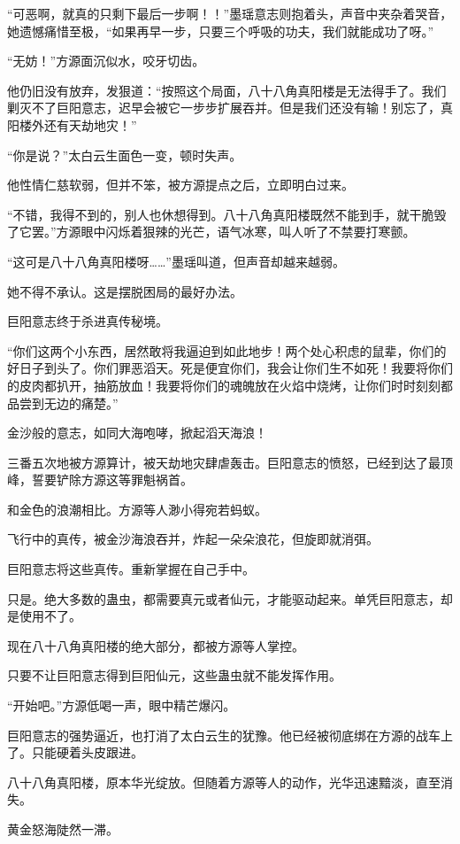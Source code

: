 \begin{this_body}
“可恶啊，就真的只剩下最后一步啊！！”墨瑶意志则抱着头，声音中夹杂着哭音，她遗憾痛惜至极，“如果再早一步，只要三个呼吸的功夫，我们就能成功了呀。”

“无妨！”方源面沉似水，咬牙切齿。

他仍旧没有放弃，发狠道：“按照这个局面，八十八角真阳楼是无法得手了。我们剿灭不了巨阳意志，迟早会被它一步步扩展吞并。但是我们还没有输！别忘了，真阳楼外还有天劫地灾！”

“你是说？”太白云生面色一变，顿时失声。

他性情仁慈软弱，但并不笨，被方源提点之后，立即明白过来。

“不错，我得不到的，别人也休想得到。八十八角真阳楼既然不能到手，就干脆毁了它罢。”方源眼中闪烁着狠辣的光芒，语气冰寒，叫人听了不禁要打寒颤。

“这可是八十八角真阳楼呀……”墨瑶叫道，但声音却越来越弱。

她不得不承认。这是摆脱困局的最好办法。

巨阳意志终于杀进真传秘境。

“你们这两个小东西，居然敢将我逼迫到如此地步！两个处心积虑的鼠辈，你们的好日子到头了。你们罪恶滔天。死是便宜你们，我会让你们生不如死！我要将你们的皮肉都扒开，抽筋放血！我要将你们的魂魄放在火焰中烧烤，让你们时时刻刻都品尝到无边的痛楚。”

金沙般的意志，如同大海咆哮，掀起滔天海浪！

三番五次地被方源算计，被天劫地灾肆虐轰击。巨阳意志的愤怒，已经到达了最顶峰，誓要铲除方源这等罪魁祸首。

和金色的浪潮相比。方源等人渺小得宛若蚂蚁。

飞行中的真传，被金沙海浪吞并，炸起一朵朵浪花，但旋即就消弭。

巨阳意志将这些真传。重新掌握在自己手中。

只是。绝大多数的蛊虫，都需要真元或者仙元，才能驱动起来。单凭巨阳意志，却是使用不了。

现在八十八角真阳楼的绝大部分，都被方源等人掌控。

只要不让巨阳意志得到巨阳仙元，这些蛊虫就不能发挥作用。

“开始吧。”方源低喝一声，眼中精芒爆闪。

巨阳意志的强势逼近，也打消了太白云生的犹豫。他已经被彻底绑在方源的战车上了。只能硬着头皮跟进。

八十八角真阳楼，原本华光绽放。但随着方源等人的动作，光华迅速黯淡，直至消失。

黄金怒海陡然一滞。


\end{this_body}
